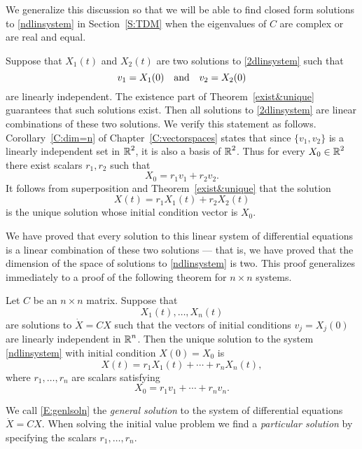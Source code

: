 \documentclass{ximera}
\begin{document}
We generalize this discussion so that we will be able to find closed form 
solutions to \eqref{ndlinsystem} in Section~\ref{S:TDM} when the eigenvalues 
of $C$ are complex or are real and equal.

Suppose that $X_1(t)$ and $X_2(t)$ are two solutions to \eqref{2dlinsystem} such
that
\[
v_1=X_1(0) \quad\mbox{and}\quad v_2=X_2(0)
\]
are linearly independent.  The existence part of
Theorem~\ref{exist&unique}
guarantees that such solutions exist.  Then all solutions to \eqref{2dlinsystem}
are linear combinations of these two solutions.  We verify this statement as
follows.  Corollary~\ref{C:dim=n} of Chapter~\ref{C:vectorspaces} states
that since $\{v_1,v_2\}$ is a linearly independent set in $\mbox{$\Bbb{R}$}^2$, it is
also a basis of $\mbox{$\Bbb{R}$}^2$.  Thus for every $X_0\in\mbox{$\Bbb{R}$}^2$ there exist scalars
$r_1,r_2$ such that
\[
X_0 = r_1v_1 + r_2v_2.
\]
It follows from superposition and Theorem~\ref{exist&unique} that the
solution
\[
X(t) = r_1X_1(t) + r_2X_2(t)
\]
is the unique solution whose initial condition vector is $X_0$.

We have proved that every solution to this linear system of differential
equations is a linear combination of these two solutions --- that is, we
have proved that the dimension of the space of solutions to \eqref{ndlinsystem}
is two.  This proof generalizes immediately to a proof of the following
theorem for $n\times n$ systems.

\begin{theorem}  \label{T:solvends}
  Let $C$ be an $n\times n$ matrix.  Suppose that \[
    X_1(t),\ldots,X_n(t)
  \]
are  solutions to $\dot{X}=CX$ such that the vectors of initial conditions
$v_j=X_j(0)$ are linearly independent in $\mbox{$\Bbb{R}$}^n$.  Then the unique solution
to the system \eqref{ndlinsystem} with initial condition $X(0)=X_0$ is
\begin{equation}  \label{E:genlsoln}
X(t)=r_1X_1(t) + \cdots + r_nX_n(t),
\end{equation}
where $r_1,\ldots,r_n$ are scalars satisfying
\begin{equation} \label{findscalars}
X_0 = r_1v_1 + \cdots + r_nv_n.
\end{equation}
\end{theorem}

We call \eqref{E:genlsoln} the {\em general solution\/} 
to the system of differential equations $\dot{X}=CX$.  When solving the
initial value problem we find a {\em particular solution\/}
by specifying the scalars $r_1,\ldots,r_n$.
\end{document}
